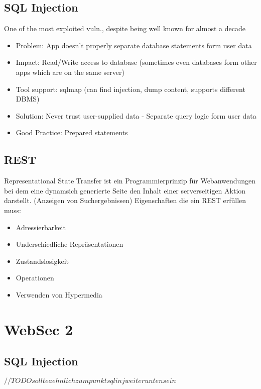 \documentclass[a4paper, 12pt]{article}
\begin{document}
\subsection{SQL Injection}
One of the most exploited vuln., despite being well known for almost a decade
\begin{itemize}
\item Problem: App doesn't properly separate database statements form user data
\item Impact: Read/Write access to database (sometimes even databases form other apps which are on the same server)
\item Tool support: sqlmap (can find injection, dump content, supports different DBMS)
\item Solution: Never trust user-supplied data - Separate query logic form user data
\item Good Practice: Prepared statements
\end{itemize}
\subsection{REST}
Representational State Transfer ist ein Programmierprinzip für Webanwendungen bei dem eine dynamsich generierte Seite den Inhalt einer serverseitigen Aktion darstellt. (Anzeigen von Suchergebnissen)
\large Eigenschaften die ein REST erfüllen muss:
\begin{itemize}
	\item Adressierbarkeit
	\item Underschiedliche Repräsentationen
	\item Zustandslosigkeit
	\item Operationen
	\item Verwenden von Hypermedia
\end{itemize}

\section{WebSec 2}
\subsection{SQL Injection}
$ //TODO sollte aehnlich zum punkt sql inj weiter unten sein $
\end{document}
